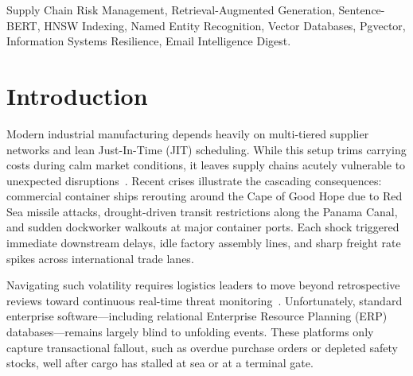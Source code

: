 \documentclass[conference]{IEEEtran}
\begin{document}
\begin{IEEEkeywords}
Supply Chain Risk Management, Retrieval-Augmented Generation, Sentence-BERT, HNSW Indexing, Named Entity Recognition, Vector Databases, Pgvector, Information Systems Resilience, Email Intelligence Digest.
\end{IEEEkeywords}

\section{Introduction}
Modern industrial manufacturing depends heavily on multi-tiered supplier networks and lean Just-In-Time (JIT) scheduling. While this setup trims carrying costs during calm market conditions, it leaves supply chains acutely vulnerable to unexpected disruptions~\cite{li2010managing, bais2023ex}. Recent crises illustrate the cascading consequences: commercial container ships rerouting around the Cape of Good Hope due to Red Sea missile attacks, drought-driven transit restrictions along the Panama Canal, and sudden dockworker walkouts at major container ports. Each shock triggered immediate downstream delays, idle factory assembly lines, and sharp freight rate spikes across international trade lanes.

Navigating such volatility requires logistics leaders to move beyond retrospective reviews toward continuous real-time threat monitoring~\cite{aboutorab2023possum}. Unfortunately, standard enterprise software---including relational Enterprise Resource Planning (ERP) databases---remains largely blind to unfolding events. These platforms only capture transactional fallout, such as overdue purchase orders or depleted safety stocks, well after cargo has stalled at sea or at a terminal gate.
\end{document}

